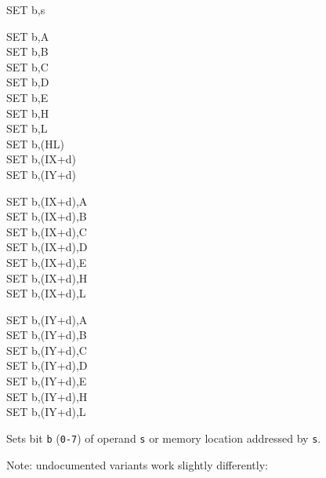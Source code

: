 \documentclass[12pt,twoside,openright,a4paper]{book}
\begin{document}
\begin{basedescript}{
	\desclabelstyle{\multilinelabel}
	\desclabelwidth{3cm}}
\begin{DetailItem}{SET b,s}
		\begin{DetailVariants}
			SET b,A\\
			SET b,B\\
			SET b,C\\
			SET b,D\\
			SET b,E\\
			SET b,H\\
			SET b,L\\
			SET b,(HL)\\
			SET b,(IX+d)\\
			SET b,(IY+d)

			\columnbreak
			SET b,(IX+d),A\UNDOC\\
			SET b,(IX+d),B\UNDOC\\
			SET b,(IX+d),C\UNDOC\\
			SET b,(IX+d),D\UNDOC\\
			SET b,(IX+d),E\UNDOC\\
			SET b,(IX+d),H\UNDOC\\
			SET b,(IX+d),L\UNDOC

			\columnbreak
			SET b,(IY+d),A\UNDOC\\
			SET b,(IY+d),B\UNDOC\\
			SET b,(IY+d),C\UNDOC\\
			SET b,(IY+d),D\UNDOC\\
			SET b,(IY+d),E\UNDOC\\
			SET b,(IY+d),H\UNDOC\\
			SET b,(IY+d),L\UNDOC
		\end{DetailVariants}

		Sets bit {\tt b} ({\tt 0-7}) of operand {\tt s} or memory location addressed by {\tt s}.

		Note: undocumented variants work slightly differently:

		\begin{multicols}{2}

		\end{multicols}

		\begin{DetailEffects}
			\FlagsSETr
		\end{DetailEffects}			

		\begin{DetailTiming}
		\end{DetailTiming}


\end{DetailItem}
\end{basedescript}
\end{document}
